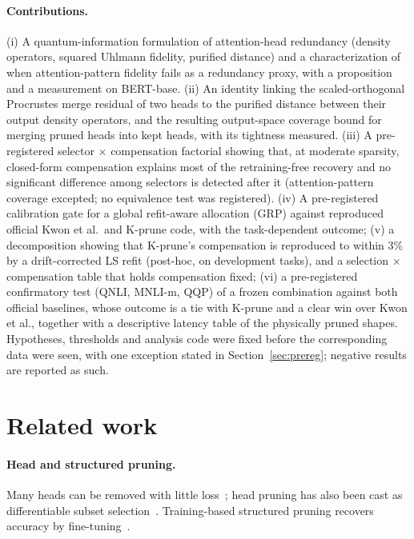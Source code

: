 \documentclass[11pt]{article}
\begin{document}
\paragraph{Contributions.} (i) A quantum-information formulation of attention-head redundancy (density operators, squared
Uhlmann fidelity, purified distance) and a characterization of when attention-pattern fidelity fails as a redundancy proxy, with
a proposition and a measurement on BERT-base. (ii) An identity linking the scaled-orthogonal Procrustes merge residual of two
heads to the purified distance between their output density operators, and the resulting output-space coverage bound for merging
pruned heads into kept heads, with its tightness measured. (iii) A pre-registered selector $\times$ compensation factorial showing that, at
moderate sparsity, closed-form compensation explains most of the retraining-free recovery and no significant difference among selectors is
detected after it (attention-pattern coverage excepted; no equivalence test was registered). (iv) A pre-registered calibration gate for a global refit-aware allocation (GRP) against reproduced official Kwon et
al.\ and K-prune code, with the task-dependent outcome; (v) a decomposition showing that K-prune's compensation is
reproduced to within 3\% by a drift-corrected LS refit (post-hoc, on development tasks), and a selection $\times$ compensation table that holds compensation fixed;
(vi) a pre-registered confirmatory test (QNLI, MNLI-m, QQP) of a frozen combination against both official baselines, whose outcome is a tie with K-prune and a
clear win over Kwon et al., together with a descriptive latency table of the physically pruned shapes.
Hypotheses, thresholds and analysis code were fixed before the corresponding data were seen, with one exception stated
in Section~\ref{sec:prereg}; negative results are reported as such.

\section{Related work}\label{sec:rw}
\paragraph{Head and structured pruning.} Many heads can be removed with little loss~\citep{michel2019sixteen,voita2019analyzing};
head pruning has also been cast as differentiable subset selection~\citep{li2021dsp}. Training-based structured pruning
recovers accuracy by fine-tuning~\citep{sanh2020movement,xia2022cofi}.
\end{document}
